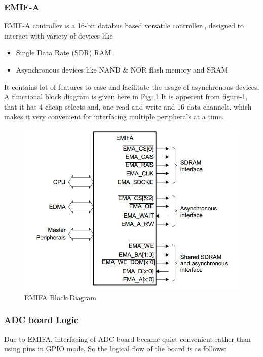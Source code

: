 \subsubsection{EMIF-A}
EMIF-A controller is a 16-bit databus based versatile controller \cite{uguide:emifa}, designed to interact with variety of devices like 
\begin{itemize}
\item Single Data Rate (SDR) RAM
\item Asynchronous devices like NAND \& NOR flash memory and SRAM
\end{itemize}
It contains lot of features to ease and facilitate the usage of asynchronous devices. A functional block diagram is given here in Fig: \ref{fig:EMIFA} 
It is apperent from figure-\ref{fig:EMIFA}, that it has 4 cheap selects and, one read and write and 16 data channels. which makes it very convenient for interfacing multiple peripherals at a time. 
\begin{figure}[ht]
\includegraphics[width=\columnwidth]{fig/EMIFA.png}
\caption{EMIFA Block Diagram \cite{uguide:emifa} }
\label{fig:EMIFA}
\end{figure}

\subsubsection{ADC board Logic}
Due to EMIFA, interfacing of ADC board became quiet convenient rather than using pins in GPIO mode. So the logical flow of the board is as follows:

